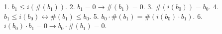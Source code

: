 1. $b_1 \leq i(\#(b_1))$.
2. $b_1 = 0 \rightarrow \#(b_1) = 0$.
3. $\#(i(b_0)) = b_0$.
4. $b_1 \leq i(b_0) \leftrightarrow \#(b_1) \leq b_0$.
5. $b_0 \cdot \#(b_1) = \#(i(b_0) \cdot b_1)$.
6. $i(b_0) \cdot b_1 = 0 \rightarrow b_0 \cdot \#(b_1) = 0$.

